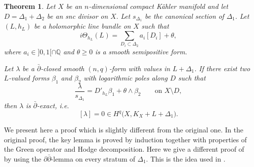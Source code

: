 \documentclass[english]{amsart}
\newcommand{\ddbar}{\partial\bar{\partial}}
\renewcommand{\ge}{\geqslant}
\newcommand{\dbar}{\bar \partial}
\newtheorem{thm}{Theorem}[section]
\numberwithin{equation}{thm}
\begin{document}
			\begin{thm}\label{ddbar01}\cite[Thm 1.1]{JCMP}
				Let $X$ be an $n$-dimensional compact K\"ahler manifold and let $D=\Delta_1+\Delta_2$ be an snc divisor on $X$.
				Let $s_{\Delta_1}$ be the canonical section of $\Delta_1$.
				Let $(L,h_L)$ be a holomorphic line bundle on $X$ such that
				\[
				i\Theta_{h_L}(L)=\sum_{D_i\subset \Delta_2} a_i [D_i]+\theta,
				\]
				where $a_i\in ]0,1[\cap \mathbb Q$ and $\theta\ge 0$ is a smooth semipositive form.
				
				Let $\lambda$ be a $\dbar$-closed smooth $(n,q)$-form with values in $L+\Delta_1$. If there exist two $L$-valued forms $\beta_1$ and $\beta_2$ with logarithmic poles along $D$ such that
				\begin{equation}\label{relation}
					\frac{\lambda}{s_{\Delta_1}}
					= D'_{h_L}\beta_1 + \theta \wedge \beta_2
					\qquad \text{on } X\setminus D,
				\end{equation}
				then $\lambda$ is $\dbar$-exact, i.e.\
				\[
				[\lambda]=0 \in H^q\bigl(X,K_X+L+\Delta_1\bigr).
				\]
			\end{thm}
			
			We present here a proof which is slightly different from the original one. In the original proof, the key lemma \cite[Lemma 4.3]{JCMP} is proved by induction together with properties of the Green operator and Hodge decomposition. Here we give a different proof of \cite[Lemma 4.3]{JCMP} by using the $\ddbar$-lemma on every stratum of $\Delta_1$. This is the idea used in \cite[Section 10.2]{CDHP}.
			
\end{document}
